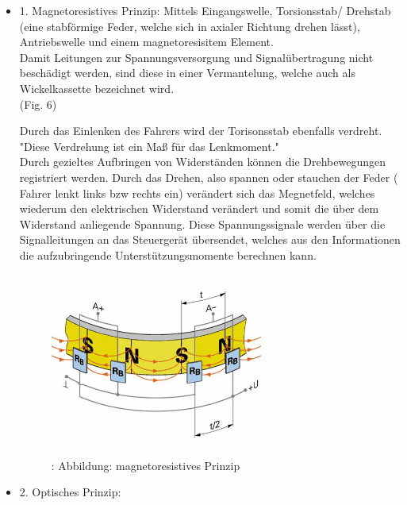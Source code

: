 	\begin{itemize}
		\item 1. Magnetoresistives Prinzip:
		Mittels Eingangswelle, Torsionsstab/ Drehstab (eine stabförmige Feder, welche sich in axialer Richtung drehen lässt), Antriebswelle und einem magnetoresisitem Element. \\
		Damit Leitungen zur Spannungsversorgung und Signalübertragung nicht beschädigt werden, sind diese in einer Vermantelung, welche auch als Wickelkassette bezeichnet wird.\\ (Fig. 6)
		
		Durch das Einlenken des Fahrers wird der Torisonsstab ebenfalls verdreht. "Diese Verdrehung ist ein Maß für das Lenkmoment."\cite{TS_dreh}\\
		Durch gezieltes Aufbringen von Widerständen können die Drehbewegungen registriert werden. Durch das Drehen, also spannen oder stauchen der Feder ( Fahrer lenkt links bzw rechts ein) verändert sich das Megnetfeld, welches wiederum den elektrischen Widerstand verändert und somit die über dem Widerstand anliegende Spannung. Diese Spannungssignale werden über die Signalleitungen an das Steuergerät übersendet, welches aus den Informationen die aufzubringende Unterstützungsmomente berechnen kann.				 
		
		\begin{figure}
			\centering
			\includegraphics[width=7cm, height=6cm] {lenkdrehmomentsensor.png}
			\caption {\cite{TS_dreh_pic_mag}: Abbildung: magnetoresistives Prinzip}
		\end{figure}			 
		
		
		\item 2. Optisches Prinzip:
		

\end{itemize}
